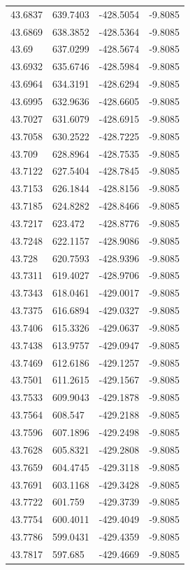 \begin{table}[H]
\begin{tabular}{llll}
43.6837 & 639.7403 & -428.5054 & -9.8085 \\
43.6869 & 638.3852 & -428.5364 & -9.8085 \\
43.69 & 637.0299 & -428.5674 & -9.8085 \\
43.6932 & 635.6746 & -428.5984 & -9.8085 \\
43.6964 & 634.3191 & -428.6294 & -9.8085 \\
43.6995 & 632.9636 & -428.6605 & -9.8085 \\
43.7027 & 631.6079 & -428.6915 & -9.8085 \\
43.7058 & 630.2522 & -428.7225 & -9.8085 \\
43.709 & 628.8964 & -428.7535 & -9.8085 \\
43.7122 & 627.5404 & -428.7845 & -9.8085 \\
43.7153 & 626.1844 & -428.8156 & -9.8085 \\
43.7185 & 624.8282 & -428.8466 & -9.8085 \\
43.7217 & 623.472 & -428.8776 & -9.8085 \\
43.7248 & 622.1157 & -428.9086 & -9.8085 \\
43.728 & 620.7593 & -428.9396 & -9.8085 \\
43.7311 & 619.4027 & -428.9706 & -9.8085 \\
43.7343 & 618.0461 & -429.0017 & -9.8085 \\
43.7375 & 616.6894 & -429.0327 & -9.8085 \\
43.7406 & 615.3326 & -429.0637 & -9.8085 \\
43.7438 & 613.9757 & -429.0947 & -9.8085 \\
43.7469 & 612.6186 & -429.1257 & -9.8085 \\
43.7501 & 611.2615 & -429.1567 & -9.8085 \\
43.7533 & 609.9043 & -429.1878 & -9.8085 \\
43.7564 & 608.547 & -429.2188 & -9.8085 \\
43.7596 & 607.1896 & -429.2498 & -9.8085 \\
43.7628 & 605.8321 & -429.2808 & -9.8085 \\
43.7659 & 604.4745 & -429.3118 & -9.8085 \\
43.7691 & 603.1168 & -429.3428 & -9.8085 \\
43.7722 & 601.759 & -429.3739 & -9.8085 \\
43.7754 & 600.4011 & -429.4049 & -9.8085 \\
43.7786 & 599.0431 & -429.4359 & -9.8085 \\
43.7817 & 597.685 & -429.4669 & -9.8085 \\

\end{tabular}
\end{table}
